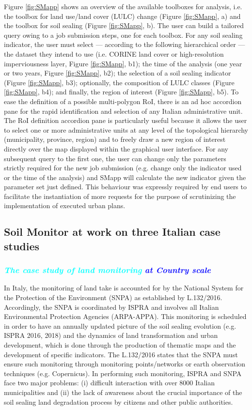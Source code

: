 \documentclass[APA,LATO1COL,doublespace]{WileyNJD-v2}
\newcommand{\reviewer}[1]{\emph{\textcolor{cyan}{#1}}}   %
\newcommand{\update}[1]{\emph{\textcolor{blue}{#1}}}     %
\begin{document}
Figure \ref{fig:SMapp} shows an overview of the available toolboxes for analysis, i.e. the toolbox for land use/land cover (LULC) change (Figure \ref{fig:SMapp}, a) and the toolbox for soil sealing (Figure \ref{fig:SMapp}, b).
The user can build a tailored query owing to a job submission steps, one for each toolbox. 
For any soil sealing indicator, the user must select --- according to the following hierarchical order --- 
the dataset they intend to use (i.e. CORINE land cover or high-resolution imperviousness layer, Figure \ref{fig:SMapp}, b1); 
the time of the analysis (one year or two years, Figure \ref{fig:SMapp}, b2); 
the selection of a soil sealing indicator (Figure \ref{fig:SMapp}, b3); 
optionally, the composition of LULC classes (Figure \ref{fig:SMapp}, b4); 
and finally, the region of interest (Figure \ref{fig:SMapp}, b5). 
To ease the definition of a possible multi-polygon RoI, there is an ad hoc accordion pane for the rapid identification and selection of any Italian administrative unit.
The RoI definition accordion pane is particularly useful because it allows the user to select one or more administrative units at any level of the topological hierarchy (municipality, province, region) and to freely draw a new region of interest directly over the map displayed within the graphical user interface.
For any subsequent query to the first one, the user can change only the parameters strictly required for the new job submission (e.g. change only the indicator used or the time of the analysis) and SMapp will calculate the new indicator given the parameter set just defined. 
This behaviour was expressly required by end users to facilitate the instantiation of more requests for the purpose of scrutinizing the implementation of executed urban plans.

\subsection{Soil Monitor at work on three Italian case studies}\label{sec:caseStudies}
\subsubsection{\reviewer{The case study of land monitoring} \update{at Country scale} }
In Italy, the monitoring of land take is accounted for by the National System for the Protection of the Environment (SNPA) as established by L.132/2016.
Accordingly, the SNPA is coordinated by ISPRA and involves all Italian Environmental Protection Agencies (ARPA-APPA). 
This monitoring is scheduled in order to have an annually updated picture of the soil sealing evolution (e.g. ISPRA 2016, 2018) and the dynamics of land transformation and urban development, which is done through the production of thematic maps and the development of specific indicators. 
The L.132/2016 states that the SNPA must ensure such monitoring through monitoring points/networks or earth observation techniques (e.g. Copernicus).
In performing such monitoring, ISPRA and SNPA face two major problems: (i) difficult interaction with over 8000 Italian municipalities and (ii) the lack of awareness about the crucial importance of the soil sealing land degradation process by citizens and other public authorities.
\end{document}
